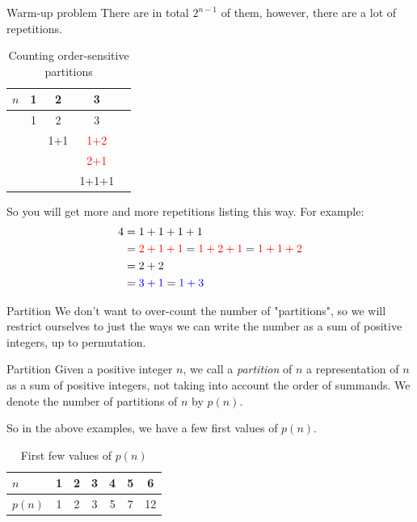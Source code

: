 \documentclass[pdf]{beamer}
\begin{document}
\begin{frame}{Warm-up problem}
    There are in total $2^{n-1}$ of them, however, there are a lot of repetitions.
    \begin{table}
        \begin{tabular}{l  c  c  c  c }
            $n$ & 1 & 2   & 3                    \\
            \hline\pause
                & 1 & 2   & 3                    \\
                &   & 1+1 & \textcolor{red}{1+2} \\
                &   &     & \textcolor{red}{2+1} \\
                &   &     & 1+1+1
        \end{tabular}
        \caption{Counting order-sensitive partitions}
    \end{table}\pause
    So you will get more and more repetitions listing this way. For example:
    \begin{align*}
        4 & = 1+1+1+1                                                                  \\
          & = \textcolor{red}{2+1+1} = \textcolor{red}{1+2+1} = \textcolor{red}{1+1+2} \\
          & = 2+2                                                                      \\
          & = \textcolor{blue}{3+1} = \textcolor{blue}{1+3}
    \end{align*}
\end{frame}

\begin{frame}{Partition}
    We don't want to over-count the number of "partitions", so we will restrict ourselves to just the ways we can write the number as a sum of positive integers, up to permutation. \pause
    \begin{block}{Partition}
        Given a positive integer $n$, we call a \textit{partition} of $n$ a representation of $n$ as a sum of positive integers, not taking into account the order of summands. We denote the number of partitions of $n$ by $p(n)$.
    \end{block} \pause
    So in the above examples, we have a few first values of $p(n)$.
    \begin{table}
        \begin{tabular}{l  | c | c | c | c | c | c | }
            $n$    & 1 & 2 & 3 & 4 & 5 & 6  \\
            \hline\pause
            $p(n)$ & 1 & 2 & 3 & 5 & 7 & 12
        \end{tabular}
        \caption{First few values of $p(n)$}
    \end{table}
\end{frame}
\end{document}
